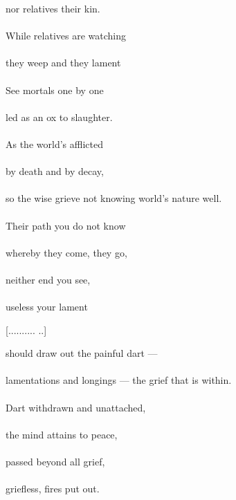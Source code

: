 \begin{MyDescription}[]{}
nor relatives their kin.\\
\\
While relatives are watching\\
\\
they weep and they lament\\
\\
See mortals one by one\\
\\
led as an ox to slaughter.\\
\\
As the world's afflicted\\
\\
by death and by decay,\\
\\
so the wise grieve not knowing world's nature well.\\
\\
Their path you do not know\\
\\
whereby they come, they go,\\
\\
neither end you see,\\
\\
useless your lament

\end{MyDescription} 
[.......... ..]
\begin{MyDescription}[]{}
should draw out the painful dart —\\
\\
lamentations and longings — the grief that is within.\\
\\
Dart withdrawn and unattached,\\
\\
the mind attains to peace,\\
\\
passed beyond all grief,\\
\\
griefless, fires put out.
\end{MyDescription} 

\begin{MyDescription}[(Sn. 574-593)]{}

\end{MyDescription}

